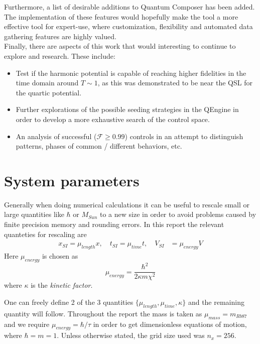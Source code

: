 \documentclass[a4paper, twocolumn]{revtex4-1}
\begin{document}
Furthermore, a list of desirable additions to Quantum Composer has been added. The implementation of these features would hopefully make the tool a more effective tool for expert-use, where customization, flexibility and automated data gathering features are highly valued. \\

Finally, there are aspects of this work that would interesting to continue to explore and research. These include:
\begin{itemize}
	\item Test if the harmonic potential is capable of reaching higher fidelities in the time domain around $T \sim 1$, as this was demonstrated to be near the QSL for the quartic potential.
	\item Further explorations of the possible seeding strategies in the QEngine in order to develop a more exhaustive search of the control space.
	\item An analysis of successful ($\mathcal{F} \geq 0.99$) controls in an attempt to distinguish patterns, phases of common / different behaviors, etc.
\end{itemize}



\appendix
\section{System parameters}\label{App:System-params}
Generally when doing numerical calculations it can be useful to rescale small or large quantities like $\hbar$ or $M_{Sun}$ to a new size in order to avoid problems caused by finite precision memory and rounding errors. In this report the relevant quanteties for rescaling are
\begin{align}
	x_{SI} = \mu_{length} x, \quad t_{SI} = \mu_{time} t, \quad V_{SI} &= \mu_{energy} V
\end{align}
Here $\mu_{energy}$ is chosen as 
\begin{equation}
	\mu_{energy} = \frac{\hbar^2}{2\kappa m \chi^2}
\end{equation}
where $\kappa$ is the \textit{kinetic factor}. 

One can freely define 2 of the 3 quantities $\{ \mu_{length},\mu_{time},\kappa \}$ and the remaining quantity will follow. Throughout the report the mass is taken as $\mu_{mass}=m_{Rb87}$ and we require $\mu_{energy} = \hbar / \tau$ in order to get dimensionless equations of motion, where $\hbar = m = 1$. Unless otherwise stated, the grid size used was $n_x = 256$. \\
\end{document}
